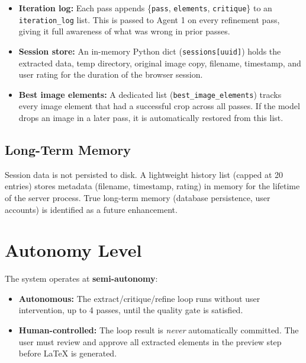 \documentclass[12pt,a4paper]{article}
\begin{document}
\begin{itemize}[noitemsep]
  \item \textbf{Iteration log:} Each pass appends \{\texttt{pass}, \texttt{elements},
    \texttt{critique}\} to an \texttt{iteration\_log} list. This is passed to Agent 1 on every
    refinement pass, giving it full awareness of what was wrong in prior passes.
  \item \textbf{Session store:} An in-memory Python dict (\texttt{sessions[uuid]}) holds the
    extracted data, temp directory, original image copy, filename, timestamp, and user rating
    for the duration of the browser session.
  \item \textbf{Best image elements:} A dedicated list (\texttt{best\_image\_elements}) tracks
    every image element that had a successful crop across all passes. If the model drops an image
    in a later pass, it is automatically restored from this list.
\end{itemize}

\subsection{Long-Term Memory}

Session data is not persisted to disk. A lightweight history list (capped at 20 entries)
stores metadata (filename, timestamp, rating) in memory for the lifetime of the server process.
True long-term memory (database persistence, user accounts) is identified as a future
enhancement.


\section{Autonomy Level}

The system operates at \textbf{semi-autonomy}:

\begin{itemize}[noitemsep]
  \item \textbf{Autonomous:} The extract/critique/refine loop runs without user intervention,
    up to 4 passes, until the quality gate is satisfied.
  \item \textbf{Human-controlled:} The loop result is \emph{never} automatically committed.
    The user must review and approve all extracted elements in the preview step before LaTeX
    is generated.
\end{itemize}
\end{document}
